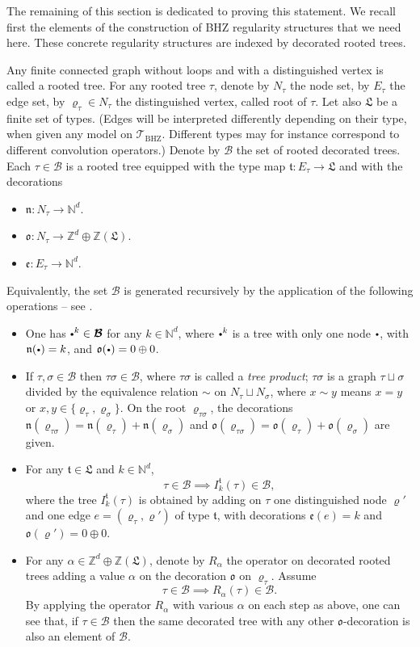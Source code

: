 \documentclass[JEP,XML,SOM,Unicode,published]{cedram}
\newcommand{\sbullet}{{\scriptscriptstyle\bullet}}
\newcommand{\scbullet}{{\raisebox{1pt}{$\sbullet$}}}
\theoremstyle{plain}
\theoremstyle{definition}
\newcommand{\BHZ}{{\scriptscriptstyle\mathrm{BHZ}}}
\newcommand{\bsmcB}{\boldsymbol{\mathcal{B}}}
\newcommand{\scrT}{\mathscr{T}}
\newcommand{\frkL}{\mathfrak{L}}
\newcommand{\frkt}{\mathfrak{t}}
\newcommand{\frkn}{\mathfrak{n}}
\newcommand{\frko}{\mathfrak{o}}
\newcommand{\frke}{\mathfrak{e}}
\newcommand{\bbN}{\mathbb{N}}
\newcommand{\bbZ}{\mathbb{Z}}
\begin{document}
The remaining of this section is dedicated to proving this statement. We recall first the elements of the construction of BHZ regularity structures that we need here. These concrete regularity structures are indexed by decorated rooted trees.

Any finite connected graph without loops and with a distinguished vertex is called a rooted tree. For any rooted tree $\tau$, denote by $N_\tau$ the node set, by $E_\tau$ the edge set, by $\varrho_\tau\in N_\tau$ the distinguished vertex, called root of $\tau$. Let also $\frkL$ be a finite set of types. (Edges will be interpreted differently depending on their type, when given any model on $\scrT_{\BHZ}$. Different types may for instance correspond to different convolution operators.) Denote by $\bsmcB$ the set of rooted decorated trees. Each $\tau\in\bsmcB$ is a rooted tree equipped with the type map $\frkt:E_\tau\to\frkL$ and with the decorations
\begin{itemize}
\item $\frkn:N_\tau\to\bbN^d$.
\item $\frko:N_\tau\to\bbZ^d\oplus\bbZ(\frkL)$.
\item $\frke:E_\tau\to\bbN^d$.
\end{itemize}
Equivalently, the set $\bsmcB$ is generated recursively by the application of the following operations -- see \cite[\S 4.3]{BHZ}.
\begin{itemize}
\item One has $\scbullet^k\in\bsmcB$ for any $k\in\bbN^d$, where $\scbullet^k$ is a tree with only one node $\scbullet$, with $\frkn(\scbullet)=k$, and $\frko(\scbullet)=0\oplus0$.
\item If $\tau,\sigma\in\bsmcB$ then $\tau\sigma\in\bsmcB$, where $\tau\sigma$ is called a \emph{tree product}; $\tau\sigma$ is a graph $\tau\sqcup\sigma$ divided by the equivalence relation $\sim$ on $N_\tau\sqcup N_\sigma$, where $x\sim y$ means $x=y$ or $x,y\in\{\varrho_\tau,\varrho_\sigma\}$. On the root $\varrho_{\tau\sigma}$, the decorations $\frkn(\varrho_{\tau\sigma})=\frkn(\varrho_\tau)+\frkn(\varrho_\sigma)$ and $\frko(\varrho_{\tau\sigma})=\frko(\varrho_\tau)+\frko(\varrho_\sigma)$ are given.
\item For any $\frkt\in\frkL$ and $k\in\bbN^d$,
\[
\tau\in\bsmcB\implies I_k^\frkt(\tau)\in\bsmcB,
\]
where the tree $I_k^\frkt(\tau)$ is obtained by adding on $\tau$ one distinguished node $\varrho'$ and one edge $e=(\varrho_\tau,\varrho')$ of type $\frkt$, with decorations $\frke(e)=k$ and $\frko(\varrho')=0\oplus0$.
\item For any $\alpha\in\bbZ^d\oplus\bbZ(\frkL)$, denote by $R_\alpha$ the operator on decorated rooted trees adding a value $\alpha$ on the decoration $\frko$ on $\varrho_\tau$. Assume
\[
\tau\in\bsmcB \implies R_\alpha(\tau)\in\bsmcB.
\]
By applying the operator $R_\alpha$ with various $\alpha$ on each step as above, one can see that, if $\tau\in\bsmcB$ then the same decorated tree with any other $\frko$-decoration is also an element of $\bsmcB$.
\end{itemize}
\end{document}
